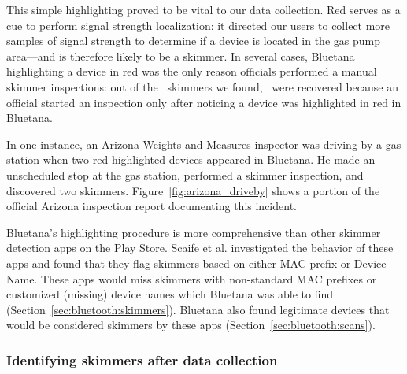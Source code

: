 This simple highlighting proved to be vital to our data collection.
%
Red serves as a cue to perform signal strength localization:
%
it directed our users to collect more samples of signal strength to determine
if a device is located in the gas pump area---and is therefore likely to
be a skimmer. 
%
In several cases, Bluetana highlighting a device in red was the only reason officials performed a manual skimmer inspections:
%
out of the \totalskimmers~skimmers we found, \Bluetanaskimmerfield~were recovered
because an official started an inspection only after noticing a device was highlighted in red in Bluetana.
%

In one instance, an Arizona Weights and Measures inspector was driving by a gas station when two red highlighted devices appeared in Bluetana.
%
He made an unscheduled stop at the gas station, performed a skimmer inspection, and discovered two skimmers.
%
Figure~\ref{fig:arizona_driveby} shows a portion of the official Arizona inspection report documenting this incident.

Bluetana's highlighting procedure is more comprehensive than other skimmer detection apps on the Play Store.
%
Scaife et al. \cite{scaifeoakland} investigated the behavior of these apps and found that they flag skimmers based on either MAC prefix or Device Name.
%
These apps would miss skimmers with non-standard MAC prefixes or customized (missing) device names which Bluetana was able to find (Section~\ref{sec:bluetooth:skimmers}).
%
Bluetana also found legitimate devices that would be considered skimmers by these apps (Section~\ref{sec:bluetooth:scans}).

\subsubsection*{Identifying skimmers after data collection}
\label{sec:blu:identify}

